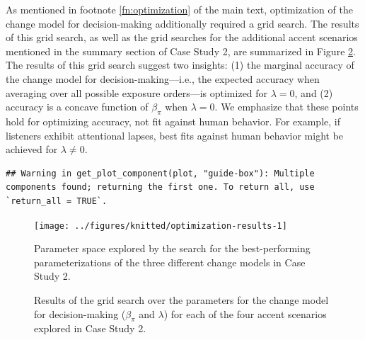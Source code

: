 \documentclass[
  11pt,
  man,floatsintext]{apa6}
\begin{document}
As mentioned in footnote \ref{fn:optimization} of the main text, optimization of the change model for decision-making additionally required a grid search. The results of this grid search, as well as the grid searches for the additional accent scenarios mentioned in the summary section of Case Study 2, are summarized in Figure \ref{fig:show-3d-grid-search}. The results of this grid search suggest two insights: (1) the marginal accuracy of the change model for decision-making---i.e., the expected accuracy when averaging over all possible exposure orders---is optimized for \(\lambda = 0\), and (2) accuracy is a concave function of \(\beta_{\pi}\) when \(\lambda = 0\). We emphasize that these points hold for optimizing accuracy, not fit against human behavior. For example, if listeners exhibit attentional lapses, best fits against human behavior might be achieved for \(\lambda \neq 0\).



\color{orange}

\begin{verbatim}## Warning in get_plot_component(plot, "guide-box"): Multiple components found; returning the first one. To return all, use `return_all = TRUE`.
\end{verbatim}

\color{black}

\begin{figure}

{\centering \texttt{[image: ../figures/knitted/optimization-results-1]} 

}

\caption{Parameter space explored by the search for the best-performing parameterizations of the three different change models in Case Study 2.}\label{fig:optimization-results}
\end{figure}



\begin{figure}

{\centering {}\newline{}\newline

}

\caption{Results of the grid search over the parameters for the change model for decision-making (\(\beta_{\pi}\) and \(\lambda\)) for each of the four accent scenarios explored in Case Study 2.}\label{fig:show-3d-grid-search}
\end{figure}
\end{document}
